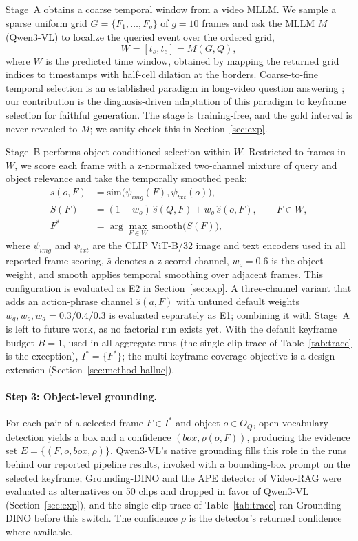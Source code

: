 \documentclass[10pt]{article}
\begin{document}
Stage~A obtains a coarse temporal window from a video MLLM. We sample a sparse uniform grid $G = \{F_1, \ldots, F_g\}$ of $g = 10$ frames and ask the MLLM $M$ (Qwen3-VL) to localize the queried event over the ordered grid,
\begin{equation}
W = [t_s, t_e] = M(G, Q),
\end{equation}
where $W$ is the predicted time window, obtained by mapping the returned grid indices to timestamps with half-cell dilation at the borders. Coarse-to-fine temporal selection is an established paradigm in long-video question answering \citep{unitime2506,focus2510,himu2603,leadqa2507}; our contribution is the diagnosis-driven adaptation of this paradigm to keyframe selection for faithful generation. The stage is training-free, and the gold interval is never revealed to $M$; we sanity-check this in Section~\ref{sec:exp}.

Stage~B performs object-conditioned selection within $W$. Restricted to frames in $W$, we score each frame with a z-normalized two-channel mixture of query and object relevance and take the temporally smoothed peak:
\begin{align}
s(o, F) &= \mathrm{sim}\big(\psi_{img}(F), \psi_{txt}(o)\big), \\
S(F) &= (1-w_o)\,\hat{s}(Q,F) + w_o\,\hat{s}(o,F), \qquad F \in W, \\
F^* &= \arg\max_{F \in W}\, \mathrm{smooth}\big(S(F)\big),
\end{align}
where $\psi_{img}$ and $\psi_{txt}$ are the CLIP ViT-B/32 image and text encoders used in all reported frame scoring, $\hat{s}$ denotes a z-scored channel, $w_o = 0.6$ is the object weight, and $\mathrm{smooth}$ applies temporal smoothing over adjacent frames. This configuration is evaluated as E2 in Section~\ref{sec:exp}. A three-channel variant that adds an action-phrase channel $\hat{s}(a,F)$ with untuned default weights $w_q, w_o, w_a = 0.3/0.4/0.3$ is evaluated separately as E1; combining it with Stage~A is left to future work, as no factorial run exists yet. With the default keyframe budget $B = 1$, used in all aggregate runs (the single-clip trace of Table~\ref{tab:trace} is the exception), $I^* = \{F^*\}$; the multi-keyframe coverage objective is a design extension (Section~\ref{sec:method-halluc}).

\paragraph{Step 3: Object-level grounding.} For each pair of a selected frame $F \in I^*$ and object $o \in O_Q$, open-vocabulary detection yields a box and a confidence $(box, \rho(o,F))$, producing the evidence set $E = \{(F, o, box, \rho)\}$. Qwen3-VL's native grounding fills this role in the runs behind our reported pipeline results, invoked with a bounding-box prompt on the selected keyframe; Grounding-DINO and the APE detector of Video-RAG \citep{videorag2411} were evaluated as alternatives on 50 clips and dropped in favor of Qwen3-VL (Section~\ref{sec:exp}), and the single-clip trace of Table~\ref{tab:trace} ran Grounding-DINO before this switch. The confidence $\rho$ is the detector's returned confidence where available.
\end{document}
